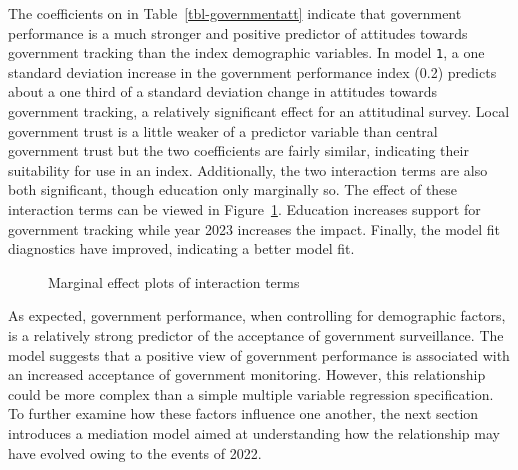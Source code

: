 \documentclass[
  number]{elsarticle}
\begin{document}
The coefficients on in Table~\ref{tbl-governmentatt} indicate that
government performance is a much stronger and positive predictor of
attitudes towards government tracking than the index demographic
variables. In model \texttt{1}, a one standard deviation increase in the
government performance index (0.2) predicts about a one third of a
standard deviation change in attitudes towards government tracking, a
relatively significant effect for an attitudinal survey. Local
government trust is a little weaker of a predictor variable than central
government trust but the two coefficients are fairly similar, indicating
their suitability for use in an index. Additionally, the two interaction
terms are also both significant, though education only marginally so.
The effect of these interaction terms can be viewed in
Figure~\ref{fig-marginplotperform}. Education increases support for
government tracking while year 2023 increases the impact. Finally, the
model fit diagnostics have improved, indicating a better model fit.

\begin{figure}


\caption{\label{fig-marginplotperform}Marginal effect plots of
interaction terms}

\end{figure}%

As expected, government performance, when controlling for demographic
factors, is a relatively strong predictor of the acceptance of
government surveillance. The model suggests that a positive view of
government performance is associated with an increased acceptance of
government monitoring. However, this relationship could be more complex
than a simple multiple variable regression specification. To further
examine how these factors influence one another, the next section
introduces a mediation model aimed at understanding how the relationship
may have evolved owing to the events of 2022.
\end{document}
